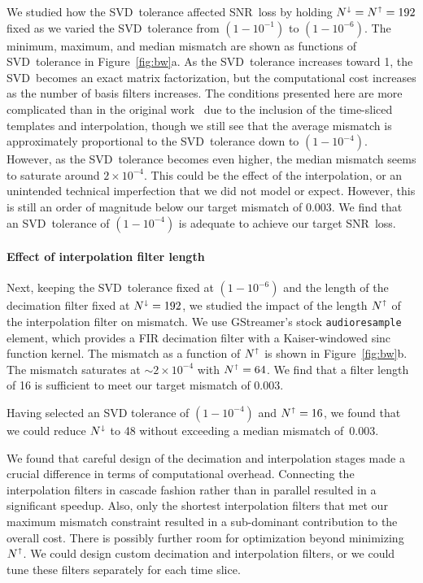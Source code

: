 \documentclass[preprint2]{aastex}
\newcommand{\SNR}{SNR}%
\newcommand{\SVD}{SVD}%
\begin{document}
We studied how the \SVD\ tolerance affected \SNR\ loss by holding
$N^\shortdownarrow = N^\shortuparrow = 192$ fixed as we varied the \SVD\
tolerance from $\left(1-10^{-1}\right)$ to $\left(1-10^{-6}\right)$.  The
minimum, maximum, and median mismatch are shown as functions of \SVD\ tolerance
in Figure~\ref{fig:bw}a.  As the \SVD\ tolerance increases toward 1, the \SVD\
becomes an exact matrix factorization, but the computational cost increases as
the number of basis filters increases.  The conditions presented here are more
complicated than in the original work~\citep{Cannon:2010p10398} due to the
inclusion of the time-sliced templates and interpolation, though we still see
that the average mismatch is approximately proportional to the \SVD\ tolerance
down to $\left(1-10^{-4}\right)$.  However, as the \SVD\ tolerance becomes even
higher, the median mismatch seems to saturate around $2 \times 10^{-4}$.  This
could be the effect of the interpolation, or an unintended technical
imperfection that we did not model or expect.  However, this is still an order
of magnitude below our target mismatch of 0.003.  We find that an \SVD\
tolerance of $\left(1-10^{-4}\right)$ is adequate to achieve our target \SNR\
loss.

\paragraph{Effect of interpolation filter length}

Next, keeping the \SVD\ tolerance fixed at $\left(1-10^{-6}\right)$ and the
length of the decimation filter fixed at $N^\shortdownarrow = 192$, we studied
the impact of the length $N^\shortuparrow$ of the interpolation filter on
mismatch.  We use GStreamer's stock
\texttt{audioresample} element, which provides a FIR decimation filter with
a Kaiser-windowed sinc function kernel.  The mismatch as a function of $N^\shortuparrow$ is shown in
Figure~\ref{fig:bw}b.  The mismatch saturates at $\sim$$2 \times 10^{-4}$ with
$N^\shortuparrow = 64$.  We find that a filter length of 16 is sufficient to
meet our target mismatch of 0.003.

Having selected an SVD tolerance of $\left(1-10^{-4}\right)$ and
$N^\shortuparrow=16$, we found that we could reduce $N^\shortdownarrow$ to 48
without exceeding a median mismatch of~0.003.

We found that careful design of the decimation and interpolation stages made a
crucial difference in terms of computational overhead.  Connecting the
interpolation filters in cascade fashion rather than in parallel resulted in a
significant speedup.  Also, only the shortest interpolation filters that met our
maximum mismatch constraint resulted in a sub-dominant contribution to the
overall cost.  There is possibly further room for optimization beyond minimizing
$N^\shortuparrow$.  We could design custom decimation and interpolation filters,
or we could tune these filters separately for each time slice.
\end{document}
